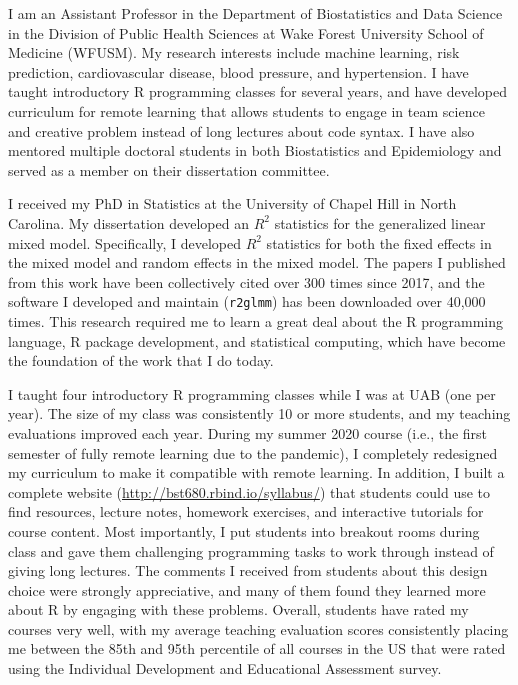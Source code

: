 \hskip 1cm I am an Assistant Professor in the Department of Biostatistics and Data Science in the Division of Public Health Sciences at Wake Forest University School of Medicine (WFUSM). My research interests include machine learning, risk prediction, cardiovascular disease, blood pressure, and hypertension. I have taught introductory R programming classes for several years, and have developed curriculum for remote learning that allows students to engage in team science and creative problem instead of long lectures about code syntax. I have also mentored multiple doctoral students in both Biostatistics and Epidemiology and served as a member on their dissertation committee. 


I received my PhD in Statistics at the University of Chapel Hill in North Carolina. My dissertation developed an $R^2$ statistics for the generalized linear mixed model. Specifically, I developed $R^2$ statistics for both the fixed effects in the mixed model and random effects in the mixed model. The papers I published from this work have been collectively cited over 300 times since 2017, and the software I developed and maintain (\texttt{r2glmm}) has been downloaded over 40,000 times. This research required me to learn a great deal about the R programming language, R package development, and statistical computing, which have become the foundation of the work that I do today.


I taught four introductory R programming classes while I was at UAB (one per year). The size of my class was consistently 10 or more students, and my teaching evaluations improved each year. During my summer 2020 course (i.e., the first semester of fully remote learning due to the pandemic), I completely redesigned my curriculum to make it compatible with remote learning. In addition, I built a complete website (\url{http://bst680.rbind.io/syllabus/}) that students could use to find resources, lecture notes, homework exercises, and interactive tutorials for course content. Most importantly, I put students into breakout rooms during class and gave them challenging programming tasks to work through instead of giving long lectures. The comments I received from students about this design choice were strongly appreciative, and many of them found they learned more about R by engaging with these problems. Overall, students have rated my courses very well, with my average teaching evaluation scores consistently placing me between the 85th and 95th percentile of all courses in the US that were rated using the Individual Development and Educational Assessment survey.

